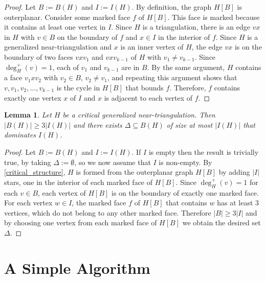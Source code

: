 \documentclass{article}
\newtheorem{lem}{Lemma}
\theoremstyle{definition}
\begin{document}
\begin{proof}
  Let $B:=B(H)$ and $I:=I(H)$.
  By definition, the graph $H[B]$ is outerplanar.  Consider some marked face $f$ of $H[B]$.  This face is marked because it contains at least one vertex in $I$.  Since $H$ is a triangulation, there is an edge $vx$ in $H$ with $v\in B$ on the boundary of $f$ and $x\in I$ in the interior of $f$. Since $H$ is a generalized near-triangulation and $x$ is an inner vertex of $H$, the edge $vx$ is on the boundary of two faces $vxv_1$ and $vxv_{k-1}$ of $H$ with $v_1\neq v_{k-1}$.  Since $\deg^+_H(v)=1$, each of $v_1$ and $v_{k-1}$ are in $B$.  By the same argument, $H$ contains a face $v_1xv_2$ with $v_2\in B$, $v_2\neq v_1$, and repeating this argument shows that $v,v_1,v_2,\ldots,v_{k-1}$ is the cycle in $H[B]$ that bounds $f$.  Therefore, $f$ contains exactly one vertex $x$ of $I$ and $x$ is adjacent to each vertex of $f$.
\end{proof}

\begin{lem}\label{base_case}
    Let $H$ be a critical generalized near-triangulation. Then $|B(H)|\ge 3|I(H)|$ and there exists $\Delta\subseteq B(H)$ of size at most $|I(H)|$ that dominates $I(H)$.
\end{lem}

\begin{proof}
  Let $B:=B(H)$ and $I:=I(H)$.  If $I$ is empty then the result is trivially true, by taking $\Delta:=\emptyset$, so we now assume that $I$ is non-empty.  By \cref{critical_structure}, $H$ is formed from the outerplanar graph $H[B]$ by adding $|I|$ stars, one in the interior of each marked face of $H[B]$.  Since $\deg_H^+(v)=1$ for each $v\in B$, each vertex of $H[B]$ is on the boundary of exactly one marked face.  For each vertex $w\in I$, the marked face $f$ of $H[B]$ that contains $w$ has at least $3$ vertices, which do not belong to any other marked face. Therefore $|B|\ge 3|I|$ and by choosing one vertex from each marked face of $H[B]$ we obtain the desired set $\Delta$.
\end{proof}


\section{A Simple Algorithm}
\label{warm_up}
\end{document}
